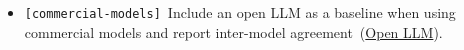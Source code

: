 \documentclass[smallextended]{svjour3}
\makeatletter
\newcommand{\should}{\textbf{should}\xspace}
\newcommand{\paper}{\emph{paper}\xspace}
\newcommand{\supplementarymaterial}{\emph{supplementary material}\xspace}
\newcommand{\paper}{\emph{paper}\xspace}
\newcommand{\supplementarymaterial}{\emph{supplementary material}\xspace}
\newcommand{\iconS}{\usebox{\iconSbox}\xspace}
\newcommand{\iconS}{○\xspace}
\newcommand{\condition}[1]{\texttt{\small[#1]}\,}
\newcommand{\condition}[1]{@@cond:#1@@}
\newcommand{\refopenllm}{\hyperref[sec:use-an-open-llm-as-a-baseline]{Open LLM}}
\newcommand{\refopenllm}{\href{/guidelines/use-an-open-llm-as-a-baseline/}{Open LLM}}
\makeatother
\begin{document}
\begin{appendices}
\begin{itemize}[label={},leftmargin=*]
    \item \iconS \condition{commercial-models} Include an open LLM as a baseline when using commercial models and report inter-model agreement~(\refopenllm).
\end{itemize}


\end{appendices}
\end{document}
